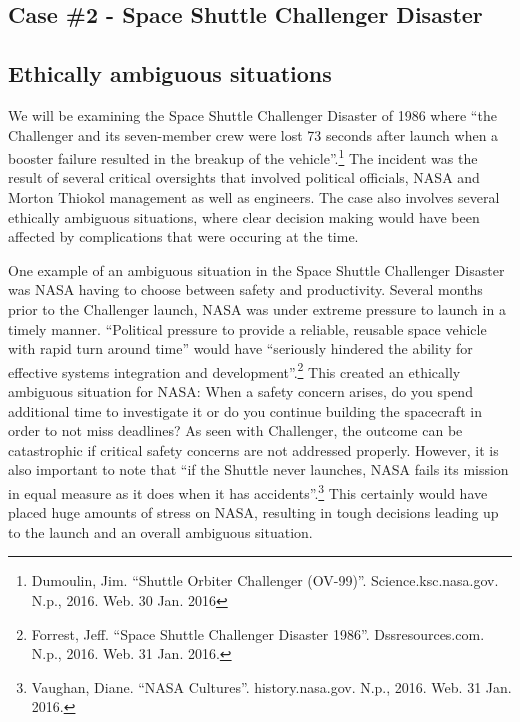 \documentclass{article}
\newcommand{\q}[1]{``#1''}
\begin{document}
\begin{center}\section*{Case \#2 - Space Shuttle Challenger Disaster}\end{center}

\subsection{Ethically ambiguous situations}

We will be examining the Space Shuttle Challenger Disaster of 1986 where \q{the Challenger and its seven-member crew were lost 73 seconds after launch when a booster failure resulted in the breakup of the vehicle}.\footnote{Dumoulin, Jim. \q{Shuttle Orbiter Challenger (OV-99)}. Science.ksc.nasa.gov. N.p., 2016. Web. 30 Jan. 2016} The incident was the result of several critical oversights that involved political officials, NASA and Morton Thiokol management as well as engineers. The case also involves several ethically ambiguous situations, where clear decision making would have been affected by complications that were occuring at the time. \par

One example of an ambiguous situation in the Space Shuttle Challenger Disaster was NASA having to choose between safety and productivity. Several months prior to the Challenger launch, NASA was under extreme pressure to launch in a timely manner. \q{Political pressure to provide a reliable, reusable space vehicle with rapid turn around time} would have \q{seriously hindered the ability for effective systems integration and development}.\footnote{Forrest, Jeff. \q{Space Shuttle Challenger Disaster 1986}. Dssresources.com. N.p., 2016. Web. 31 Jan. 2016.} This created an ethically ambiguous situation for NASA: When a safety concern arises, do you spend additional time to investigate it or do you continue building the spacecraft in order to not miss deadlines? As seen with Challenger, the outcome can be catastrophic if critical safety concerns are not addressed properly. However, it is also important to note that \q{if the Shuttle never launches, NASA fails its mission in equal measure as it does when it has accidents}.\footnote{Vaughan, Diane. \q{NASA Cultures}. history.nasa.gov. N.p., 2016. Web. 31 Jan. 2016.} This certainly would have placed huge amounts of stress on NASA, resulting in tough decisions leading up to the launch and an overall ambiguous situation. \par
\end{document}
